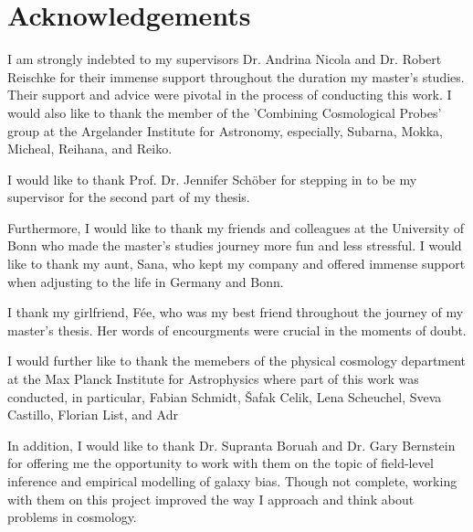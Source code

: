 
\chapter*{Acknowledgements}%
\label{sec:ack}

I am strongly indebted to my supervisors Dr. Andrina Nicola and Dr. Robert Reischke for their immense support throughout the duration my master's studies. Their support and advice were pivotal in the process of conducting this work. I would also like to thank the member of the 'Combining Cosmological Probes' group at the Argelander Institute for Astronomy, especially, Subarna, Mokka, Micheal, Reihana, and Reiko.

I would like to thank Prof. Dr. Jennifer Schöber for stepping in to be my supervisor for the second part of my thesis.

Furthermore, I would like to thank my friends and colleagues at the University of Bonn who made the master's studies journey more fun and less stressful. I would like to thank my aunt, Sana, who kept my company and offered immense support when adjusting to the life in Germany and Bonn. 

I thank my girlfriend, Fée, who was my best friend throughout the journey of my master's thesis. Her words of encourgments were crucial in the moments of doubt. 

I would further like to thank the memebers of the physical cosmology department at the Max Planck Institute for Astrophysics where part of this work was conducted, in particular, Fabian Schmidt, Šafak Celik, Lena Scheuchel, Sveva Castillo, Florian List, and Adr


In addition, I would like to thank Dr. Supranta Boruah and Dr. Gary Bernstein for offering me the opportunity to work with them on the topic of field-level inference and empirical modelling of galaxy bias. Though not complete, working with them on this project improved the way I approach and think about problems in cosmology.